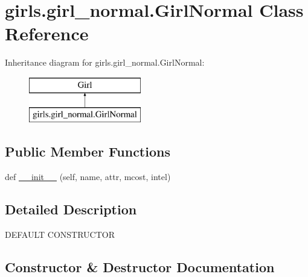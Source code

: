 \hypertarget{classgirls_1_1girl__normal_1_1_girl_normal}{}\section{girls.\+girl\+\_\+normal.\+Girl\+Normal Class Reference}
\label{classgirls_1_1girl__normal_1_1_girl_normal}
Inheritance diagram for girls.\+girl\+\_\+normal.\+Girl\+Normal\+:\begin{figure}[H]
\begin{center}
\leavevmode
\includegraphics[height=2.000000cm]{classgirls_1_1girl__normal_1_1_girl_normal}
\end{center}
\end{figure}
\subsection*{Public Member Functions}
\begin{DoxyCompactItemize}
\item 
def \hyperlink{classgirls_1_1girl__normal_1_1_girl_normal_abf16c987e4715cd19653577aaaca853c}{\+\_\+\+\_\+init\+\_\+\+\_\+} (self, name, attr, mcost, intel)
\end{DoxyCompactItemize}


\subsection{Detailed Description}
\begin{DoxyVerb}DEFAULT CONSTRUCTOR\end{DoxyVerb}
 

\subsection{Constructor \& Destructor Documentation}
